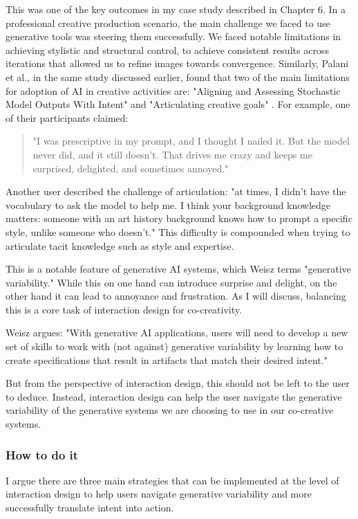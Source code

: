 This was one of the key outcomes in my case study described in Chapter 6. In a professional creative production scenario, the main challenge we faced to use generative tools was steering them successfully. We faced notable limitations in achieving stylistic and structural control, to achieve consistent results across iterations that allowed us to refine images towards convergence. Similarly, Palani et al., in the same study discussed earlier, found that two of the main limitations for adoption of AI in creative activities are: "Aligning and Assessing Stochastic Model Outputs With Intent" and "Articulating creative goals" \cite{Palani2024-on}. For example, one of their participants claimed:
\begin{quote}
"I was prescriptive in my prompt, and I thought I nailed it. But the model never did, and it still doesn’t. That drives me crazy and keeps me surprised, delighted, and sometimes annoyed."
\end{quote}
Another user described the challenge of articulation: "at times, I didn’t have the vocabulary to ask the model to help me. I think your background knowledge matters: someone with an art history background knows how to prompt a specific style, unlike someone who doesn’t." This difficulty is compounded when trying to articulate tacit knowledge such as style and expertise.

This is a notable feature of generative AI systems, which Weisz \cite{Weisz2024-io} terms "generative variability." While this on one hand can introduce surprise and delight, on the other hand it can lead to annoyance and frustration. As I will discuss, balancing this is a core task of interaction design for co-creativity.

Weisz argues: "With generative AI applications, users will need to develop a new set of skills to work with (not against) generative variability by learning how to create specifications that result in artifacts that match their desired intent."

But from the perspective of interaction design, this should not be left to the user to deduce. Instead, interaction design can help the user navigate the generative variability of the generative systems we are choosing to use in our co-creative systems.

\subsubsection{How to do it}

I argue there are three main strategies that can be implemented at the level of interaction design to help users navigate generative variability and more successfully translate intent into action.

